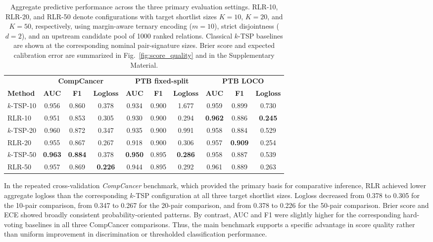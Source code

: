 \documentclass[journal]{IEEEtran}
\begin{document}
\begin{table}[t]
\centering
\caption{Aggregate predictive performance across the three primary evaluation settings. RLR-10, RLR-20, and RLR-50 denote configurations with target shortlist sizes $K=10$, $K=20$, and $K=50$, respectively, using margin-aware ternary encoding ($m=10$), strict disjointness ($d=2$), and an upstream candidate pool of 1000 ranked relations. Classical $k$-TSP baselines are shown at the corresponding nominal pair-signature sizes. Brier score and expected calibration error are summarized in Fig.~\ref{fig:score_quality} and in the Supplementary Material.}
\label{tab:world_performance}
\small
\setlength{\tabcolsep}{4pt}
\begin{tabular}{lccc|ccc|ccc}
\toprule
& \multicolumn{3}{c|}{\textbf{CompCancer}}
& \multicolumn{3}{c|}{\textbf{PTB fixed-split}}
& \multicolumn{3}{c}{\textbf{PTB LOCO}} \\
\cmidrule(lr){2-4} \cmidrule(lr){5-7} \cmidrule(l){8-10}
\textbf{Method} & \textbf{AUC} & \textbf{F1} & \textbf{Logloss}
                & \textbf{AUC} & \textbf{F1} & \textbf{Logloss}
                & \textbf{AUC} & \textbf{F1} & \textbf{Logloss} \\
\midrule
$k$-TSP-10 & 0.956 & 0.860 & 0.378
           & 0.934 & 0.900 & 1.677
           & 0.959 & 0.899 & 0.730 \\

RLR-10     & 0.951 & 0.853 & 0.305
           & 0.930 & 0.900 & 0.294
           & \textbf{0.962} & 0.886 & \textbf{0.245} \\
\midrule
$k$-TSP-20 & 0.960 & 0.872 & 0.347
           & 0.935 & 0.900 & 0.991
           & 0.958 & 0.884 & 0.529 \\

RLR-20     & 0.955 & 0.867 & 0.267
           & 0.918 & 0.900 & 0.306
           & 0.957 & \textbf{0.909} & 0.254 \\
\midrule
$k$-TSP-50 & \textbf{0.963} & \textbf{0.884} & 0.378
           & \textbf{0.950} & 0.895 & \textbf{0.286}
           & 0.958 & 0.887 & 0.539 \\

RLR-50     & 0.957 & 0.869 & \textbf{0.226}
           & 0.944 & 0.895 & 0.292
           & 0.961 & 0.889 & 0.263 \\
\bottomrule
\end{tabular}
\end{table}

In the repeated cross-validation \emph{CompCancer} benchmark, which provided the primary basis for comparative inference, RLR achieved lower aggregate logloss than the corresponding $k$-TSP configuration at all three target shortlist sizes. Logloss decreased from 0.378 to 0.305 for the 10-pair comparison, from 0.347 to 0.267 for the 20-pair comparison, and from 0.378 to 0.226 for the 50-pair comparison. Brier score and ECE showed broadly consistent probability-oriented patterns. By contrast, AUC and F1 were slightly higher for the corresponding hard-voting baselines in all three CompCancer comparisons. Thus, the main benchmark supports a specific advantage in score quality rather than uniform improvement in discrimination or thresholded classification performance.
\end{document}
